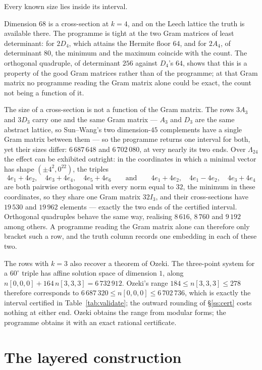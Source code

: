 \documentclass[11pt]{amsart}
\theoremstyle{remark}
\newcommand{\Leech}{\Lambda_{24}}
\begin{document}
Every known size lies inside its interval.

Dimension $68$ is a cross-section at $k=4$, and on the Leech lattice the truth is
available there. The programme is tight at the two Gram matrices of least
determinant: for $2D_4$, which attains the Hermite floor $64$, and for $2A_4$, of
determinant $80$, the minimum and the maximum coincide with the count. The
orthogonal quadruple, of determinant $256$ against $D_4$'s $64$,
shows that this is a property of the good Gram matrices rather than of the
programme; at that Gram matrix no programme reading the Gram matrix alone could
be exact, the count not being a function of it.

The size of a cross-section is not a function of the Gram matrix. The rows $3A_3$
and $3D_3$ carry one and the same Gram matrix --- $A_3$ and $D_3$ are the same
abstract lattice, so Sun--Wang's two dimension-$45$ complements have a single Gram
matrix between them --- so the programme returns one interval for both, yet their
sizes differ:
$6\,687\,648$ and $6\,702\,080$, at very nearly its two ends.
Over $\Leech$ the effect can be exhibited outright: in the
coordinates in which a minimal vector has shape $(\pm4^2,0^{22})$, the triples
\[
  4e_1+4e_2,\quad 4e_3+4e_4,\quad 4e_5+4e_6
  \qquad\text{and}\qquad
  4e_1+4e_2,\quad 4e_1-4e_2,\quad 4e_3+4e_4
\]
are both pairwise orthogonal with every norm equal to $32$, the minimum in these
coordinates, so they share one Gram matrix $32I_3$, and their cross-sections have $19\,530$ and $19\,962$ elements ---
exactly the two ends of the certified interval. Orthogonal quadruples behave the
same way, realising $8\,616$, $8\,760$ and $9\,192$ among others. A programme
reading the Gram matrix alone can therefore only bracket such a row, and the
truth column records one embedding in each of these two.

The rows with $k=3$ also recover a theorem of Ozeki. The three-point system for a
$60^\circ$ triple has affine solution space of dimension $1$, along
$n[0,0,0]+164\,n[3,3,3]=6\,732\,912$. Ozeki's range $184\le n[3,3,3]\le278$
\cite[Theorem 6.3]{ozeki2016} therefore corresponds to
$6\,687\,320\le n[0,0,0]\le6\,702\,736$, which is exactly the interval certified
in Table~\ref{tab:validate}; the outward rounding of \S\ref{ss:cert} costs
nothing at either end. Ozeki obtains the range from modular forms; the programme
obtains it with an exact rational certificate.

\section{The layered construction}\label{sec:cap}
\end{document}
